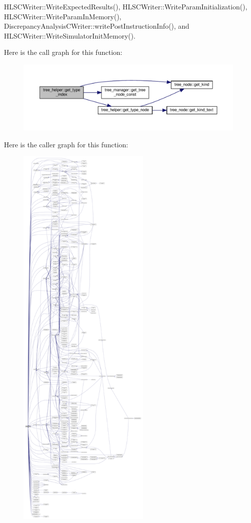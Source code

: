 H\+L\+S\+C\+Writer\+::\+Write\+Expected\+Results(), H\+L\+S\+C\+Writer\+::\+Write\+Param\+Initialization(), H\+L\+S\+C\+Writer\+::\+Write\+Param\+In\+Memory(), Discrepancy\+Analysis\+C\+Writer\+::write\+Post\+Instruction\+Info(), and H\+L\+S\+C\+Writer\+::\+Write\+Simulator\+Init\+Memory().

Here is the call graph for this function\+:
\nopagebreak
\begin{figure}[H]
\begin{center}
\leavevmode
\includegraphics[width=350pt]{d7/d99/classtree__helper_a4be4d473adb56f120981a29eda1bf3cc_cgraph}
\end{center}
\end{figure}
Here is the caller graph for this function\+:
\nopagebreak
\begin{figure}[H]
\begin{center}
\leavevmode
\includegraphics[height=550pt]{d7/d99/classtree__helper_a4be4d473adb56f120981a29eda1bf3cc_icgraph}
\end{center}
\end{figure}
